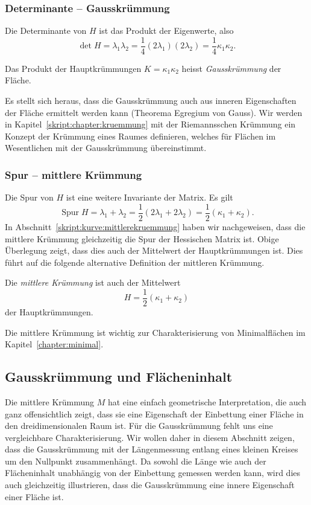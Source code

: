 \subsubsection{Determinante -- Gausskrümmung}
Die Determinante von $H$ ist das Produkt der Eigenwerte, also
\[
\det H
=
\lambda_1\lambda_2
=
\frac14 (2\lambda_1) (2\lambda_2)
=
\frac14 \kappa_1\kappa_2.
\]
\begin{definition}
\label{skript:definition:gausskruemmung}
Das Produkt der Hauptkrümmungen $K=\kappa_1\kappa_2$
heisst {\em Gausskrümmung} der Fläche.
\end{definition}
Es stellt sich heraus, dass die Gausskrümmung auch aus inneren Eigenschaften
der Fläche ermittelt werden kann
(Theorema Egregium von Gauss).
Wir werden in Kapitel~\ref{skript:chapter:kruemmung} 
mit der Riemannsschen Krümmung ein Konzept der Krümmung eines Raumes
definieren, welches für Flächen im Wesentlichen mit der Gausskrümmung
übereinstimmt.

\subsubsection{Spur -- mittlere Krümmung}
Die Spur von $H$ ist eine weitere Invariante der Matrix.
Es gilt
\[
\operatorname{Spur} H
=
\lambda_1+\lambda_2
=
\frac12(2\lambda_1+2\lambda_2)
=
\frac12(\kappa_1+\kappa_2).
\]
In Abschnitt~\ref{skript:kurve:mittlerekruemmung} haben wir nachgeweisen,
dass die mittlere Krümmung gleichzeitig die Spur der Hessischen Matrix ist.
Obige Überlegung zeigt, dass dies auch der Mittelwert der Hauptkrümmungen ist.
Dies führt auf die folgende alternative Definition der mittleren Krümmung.

\begin{definition}
\label{skript:definition:mittlerekruemmung2}
Die {\em mittlere Krümmung} ist auch der Mittelwert
\[
H=\frac12(\kappa_1+\kappa_2)
\]
der Hauptkrümmungen.
\end{definition}
Die mittlere Krümmung ist wichtig zur Charakterisierung von Minimalflächen
im Kapitel~\ref{chapter:minimal}.

\subsection{Gausskrümmung und Flächeninhalt}
Die mittlere Krümmung $M$ hat eine einfach geometrische Interpretation,
die auch ganz offensichtlich zeigt, dass sie eine Eigenschaft der Einbettung
einer Fläche in den dreidimensionalen Raum ist.
Für die Gausskrümmung fehlt uns eine vergleichbare Charakterisierung.
Wir wollen daher in diesem Abschnitt zeigen, dass die Gausskrümmung
mit der Längenmessung entlang eines kleinen Kreises um den Nullpunkt
zusammenhängt.
Da sowohl die Länge wie auch der Flächeninhalt unabhängig von der
Einbettung gemessen werden kann,
wird dies auch gleichzeitig illustrieren, dass die Gausskrümmung eine
innere Eigenschaft einer Fläche ist.

